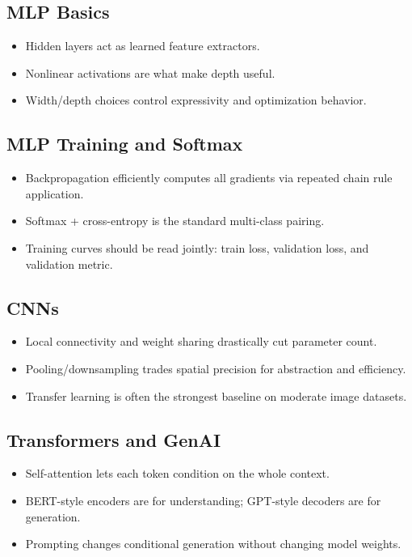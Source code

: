 \documentclass[10pt,twocolumn]{article}
\begin{document}
\subsection{MLP Basics}
\begin{itemize}
  \item Hidden layers act as learned feature extractors.
  \item Nonlinear activations are what make depth useful.
  \item Width/depth choices control expressivity and optimization behavior.
\end{itemize}

\subsection{MLP Training and Softmax}
\begin{itemize}
  \item Backpropagation efficiently computes all gradients via repeated chain rule application.
  \item Softmax + cross-entropy is the standard multi-class pairing.
  \item Training curves should be read jointly: train loss, validation loss, and validation metric.
\end{itemize}

\subsection{CNNs}
\begin{itemize}
  \item Local connectivity and weight sharing drastically cut parameter count.
  \item Pooling/downsampling trades spatial precision for abstraction and efficiency.
  \item Transfer learning is often the strongest baseline on moderate image datasets.
\end{itemize}

\subsection{Transformers and GenAI}
\begin{itemize}
  \item Self-attention lets each token condition on the whole context.
  \item BERT-style encoders are for understanding; GPT-style decoders are for generation.
  \item Prompting changes conditional generation without changing model weights.
\end{itemize}
\end{document}
